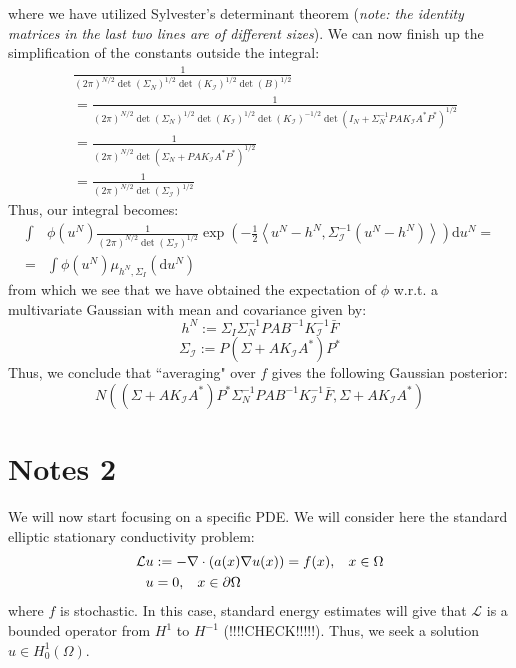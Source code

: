 \documentclass{article}
\theoremstyle{definition}
\theoremstyle{remark}
\begin{document}
where we have utilized Sylvester's determinant theorem (\textit{note: the identity matrices in the last two lines are of different sizes}). We can now finish up the simplification of the constants outside the integral:
\begin{align*}
    &\frac{1}{(2\pi)^{N/2}\det(\Sigma_N)^{1/2}\det(K_\mathcal{I})^{1/2}\det(B)^{1/2}} \\
    &=\frac{1}{(2\pi)^{N/2}\det(\Sigma_N)^{1/2}\det(K_\mathcal{I})^{1/2}\det(K_{\mathcal{I}})^{-1/2}\det(I_{N}+\Sigma_{N}^{-1}PAK_{\mathcal{I}}A^{*}P^{*})^{1/2}} \\
    &= \frac{1}{(2\pi)^{N/2}\det(\Sigma_{N} + PAK_{\mathcal{I}}A^{*}P^{*})^{1/2}} \\
    &=\frac{1}{(2\pi)^{N/2}\det(\Sigma_{\mathcal{I}})^{1/2}}
\end{align*}
Thus, our integral becomes:
\begin{align}
    \int&\phi(u^{N})\frac{1}{(2\pi)^{N/2}\det(\Sigma_{\mathcal{I}})^{1/2}}\exp\left(-\frac{1}{2}\left\langle u^{N}-h^{N}, \Sigma_{\mathcal{I}}^{-1}(u^{N}-h^{N}) \right\rangle\right)\mathrm{d}u^N = \nonumber \\
    =&\int\phi(u^{N})\mu_{h^{N},\Sigma_{I}}(\mathrm{d}u^N)
\end{align}
from which we see that we have obtained the expectation of $\phi$ w.r.t. a multivariate Gaussian with mean and covariance given by:
\begin{equation}
    h^{N}:=\Sigma_{I}\Sigma_{N}^{-1}PAB^{-1}K_{\mathcal{I}}^{-1}\bar{F}
\end{equation}
\begin{equation}
    \Sigma_{\mathcal{I}}:=P(\Sigma+AK_{\mathcal{I}}A^{*})P^{*}
\end{equation}
Thus, we conclude that ``averaging" over $f$ gives the following Gaussian posterior:
\begin{equation}
    \label{posteriorDist}
    N\left((\Sigma+AK_{\mathcal{I}}A^{*})P^{*}\Sigma_{N}^{-1}PAB^{-1}K_{\mathcal{I}}^{-1}\bar{F},\Sigma+AK_{\mathcal{I}}A^{*}\right)
\end{equation}

\section{Notes 2}

We will now start focusing on a specific PDE. We will consider here the standard elliptic stationary conductivity problem:
\begin{align}
    \label{standard_conduct}
    \begin{split}
        \mathcal{L}u &:= -\nabla\cdot(a(x)\nabla u(x))=f(x), \hspace{0.3cm} x\in\Omega \\
        u&=0, \hspace{0.3cm} x\in\partial\Omega
    \end{split}
\end{align}
where $f$ is stochastic. In this case, standard energy estimates will give that $\mathcal{L}$ is a bounded operator from $H^1$ to $H^{-1}$ (!!!!CHECK!!!!!). Thus, we seek a solution $u\in H_{0}^{1}(\Omega)$. \\
\end{document}
